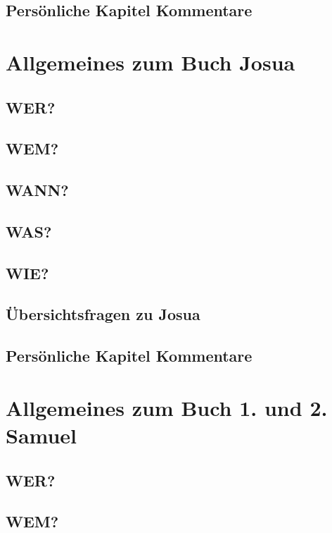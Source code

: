 \subsection{Persönliche Kapitel Kommentare}
\section{Allgemeines zum Buch Josua}
\subsection{WER?}
\subsection{WEM?}
\subsection{WANN?}
\subsection{WAS?}
\subsection{WIE?}
\subsection{Übersichtsfragen zu Josua}
    
\subsection{Persönliche Kapitel Kommentare}
\section{Allgemeines zum Buch 1. und 2. Samuel}
\subsection{WER?}
\subsection{WEM?}
